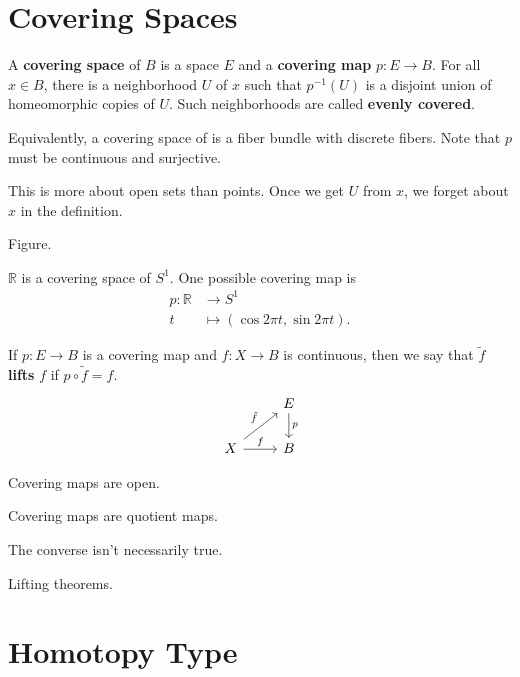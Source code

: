 \documentclass[twoside,10pt]{report}
\begin{document}

\section{Covering Spaces}

\begin{defn}[]
	A \textbf{covering space} of $B$ is a space $E$ and a \textbf{covering map} $p:E\to B$. For all $x \in B$, there is a neighborhood $U$ of $x$ such that $p^{-1}(U)$ is a disjoint union of homeomorphic copies of $U$. Such neighborhoods are called \textbf{evenly covered}.
\end{defn}
Equivalently, a covering space of is a fiber bundle with discrete fibers. Note that $p$ must be continuous and surjective.

This is more about open sets than points. Once we get $U$ from $x$, we forget about $x$ in the definition.

{\color{red}Figure.}

\begin{ex}[]
	$\mathbb{R}$ is a covering space of $S^{1}$. One possible covering map is
		\begin{align*}
			p:\mathbb{R}&\to S^{1}\\
			t&\mapsto (\cos 2\pi t,\sin 2\pi t).
		\end{align*}
\end{ex}

\begin{defn}[]
If $p:E\to B$ is a covering map and $f:X\to B$ is continuous, then we say that $\tilde{f}$ \textbf{lifts} $f$ if $p \circ \tilde{f}=f$.
\[
\begin{tikzcd}
	&E\dar{p}\\
	X\rar{f}\arrow[ur,"\tilde{f}"]&B
\end{tikzcd}
\] 
\end{defn}

\begin{prop}
Covering maps are open.
\end{prop}

\begin{cor}
Covering maps are quotient maps.
\end{cor}
{\color{red}The converse isn't necessarily true.}

{\color{red}Lifting theorems.}


\section{Homotopy Type}
\end{document}
